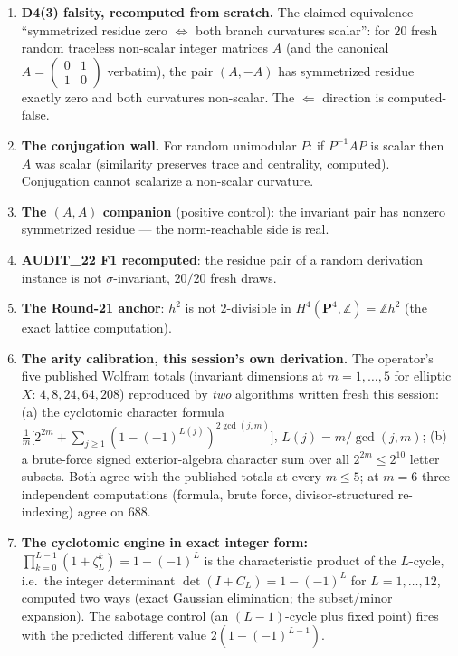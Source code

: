 \documentclass[11pt]{article}
\newcommand{\Z}{\mathbb{Z}}
\begin{document}
\begin{enumerate}[label=(V\arabic*)]
\item \textbf{D4(3) falsity, recomputed from scratch.} The claimed
equivalence ``symmetrized residue zero $\Leftrightarrow$ both branch
curvatures scalar'': for $20$ fresh random traceless non-scalar integer
matrices $A$ (and the canonical $A=\left(\begin{smallmatrix}0&1\\1&0\end{smallmatrix}\right)$
verbatim), the pair $(A,-A)$ has symmetrized residue exactly zero and both
curvatures non-scalar. The $\Leftarrow$ direction is computed-false.
\item \textbf{The conjugation wall.} For random unimodular $P$: if
$P^{-1}AP$ is scalar then $A$ was scalar (similarity preserves trace and
centrality, computed). Conjugation cannot scalarize a non-scalar curvature.
\item \textbf{The $(A,A)$ companion} (positive control): the invariant pair
has nonzero symmetrized residue --- the norm-reachable side is real.
\item \textbf{AUDIT\_22 F1 recomputed}: the residue pair of a random
derivation instance is not $\sigma$-invariant, $20/20$ fresh draws.
\item \textbf{The Round-21 anchor}: $h^2$ is not $2$-divisible in
$H^4(\mathbf{P}^4,\Z)=\Z h^2$ (the exact lattice computation).
\item \textbf{The arity calibration, this session's own derivation.} The
operator's five published Wolfram totals (invariant dimensions at
$m=1,\dots,5$ for elliptic $X$: $4,8,24,64,208$) reproduced by \emph{two}
algorithms written fresh this session: (a) the cyclotomic character formula
$\frac1m\bigl[2^{2m}+\sum_{j\ge1}(1-(-1)^{L(j)})^{2\gcd(j,m)}\bigr]$,
$L(j)=m/\gcd(j,m)$; (b) a brute-force signed exterior-algebra character sum
over all $2^{2m}\le 2^{10}$ letter subsets. Both agree with the published
totals at every $m\le 5$; at $m=6$ three independent computations (formula,
brute force, divisor-structured re-indexing) agree on $688$.
\item \textbf{The cyclotomic engine in exact integer form:}
$\prod_{k=0}^{L-1}(1+\zeta_L^k)=1-(-1)^L$ is the characteristic product of
the $L$-cycle, i.e.\ the integer determinant
$\det(I+C_L)=1-(-1)^L$ for $L=1,\dots,12$, computed two ways (exact Gaussian
elimination; the subset/minor expansion). The sabotage control (an
$(L-1)$-cycle plus fixed point) fires with the predicted different value
$2(1-(-1)^{L-1})$.

\end{enumerate}
\end{document}
